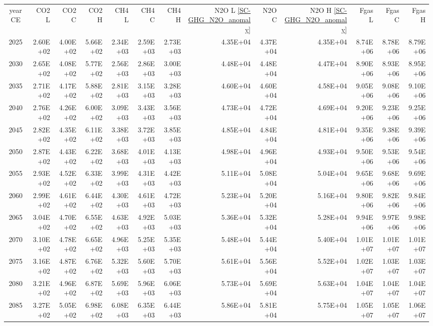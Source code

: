 \documentclass{article}
\begin{document}
\begin{table}
\begin{tabular}{crrr|rrr|rrr|rrr}
year CE  & CO2 L    & CO2 C    & CO2 H    & CH4 L    & CH4 C    & CH4 H    & N2O L \ref{SC-GHG_N2O_anomaly}     & N2O C      & N2O H \ref{SC-GHG_N2O_anomaly}    & Fgas L   & Fgas C   & Fgas H   \\
2025     & 2.60E+02 & 4.00E+02 & 5.66E+02 & 2.34E+03 & 2.59E+03 & 2.73E+03 & 4.35E+04 & 4.37E+04 & 4.35E+04 & 8.74E+06 & 8.78E+06 & 8.79E+06 \\
2030     & 2.65E+02 & 4.08E+02 & 5.77E+02 & 2.56E+03 & 2.86E+03 & 3.00E+03 & 4.48E+04 & 4.48E+04 & 4.47E+04 & 8.90E+06 & 8.93E+06 & 8.95E+06 \\
2035     & 2.71E+02 & 4.17E+02 & 5.88E+02 & 2.81E+03 & 3.15E+03 & 3.28E+03 & 4.60E+04 & 4.60E+04 & 4.58E+04 & 9.05E+06 & 9.08E+06 & 9.10E+06 \\
2040     & 2.76E+02 & 4.26E+02 & 6.00E+02 & 3.09E+03 & 3.43E+03 & 3.56E+03 & 4.73E+04 & 4.72E+04 & 4.69E+04 & 9.20E+06 & 9.23E+06 & 9.25E+06 \\
2045     & 2.82E+02 & 4.35E+02 & 6.11E+02 & 3.38E+03 & 3.72E+03 & 3.85E+03 & 4.85E+04 & 4.84E+04 & 4.81E+04 & 9.35E+06 & 9.38E+06 & 9.39E+06 \\
2050     & 2.87E+02 & 4.43E+02 & 6.22E+02 & 3.68E+03 & 4.01E+03 & 4.13E+03 & 4.98E+04 & 4.96E+04 & 4.93E+04 & 9.50E+06 & 9.53E+06 & 9.54E+06 \\
2055     & 2.93E+02 & 4.52E+02 & 6.33E+02 & 3.99E+03 & 4.31E+03 & 4.42E+03 & 5.11E+04 & 5.08E+04 & 5.04E+04 & 9.65E+06 & 9.68E+06 & 9.69E+06 \\
2060     & 2.99E+02 & 4.61E+02 & 6.44E+02 & 4.30E+03 & 4.61E+03 & 4.72E+03 & 5.23E+04 & 5.20E+04 & 5.16E+04 & 9.80E+06 & 9.82E+06 & 9.84E+06 \\
2065     & 3.04E+02 & 4.70E+02 & 6.55E+02 & 4.63E+03 & 4.92E+03 & 5.03E+03 & 5.36E+04 & 5.32E+04 & 5.28E+04 & 9.94E+06 & 9.97E+06 & 9.98E+06 \\
2070     & 3.10E+02 & 4.78E+02 & 6.65E+02 & 4.96E+03 & 5.25E+03 & 5.35E+03 & 5.48E+04 & 5.44E+04 & 5.40E+04 & 1.01E+07 & 1.01E+07 & 1.01E+07 \\
2075     & 3.16E+02 & 4.87E+02 & 6.76E+02 & 5.32E+03 & 5.60E+03 & 5.70E+03 & 5.61E+04 & 5.56E+04 & 5.52E+04 & 1.02E+07 & 1.03E+07 & 1.03E+07 \\
2080     & 3.21E+02 & 4.96E+02 & 6.87E+02 & 5.69E+03 & 5.96E+03 & 6.06E+03 & 5.73E+04 & 5.69E+04 & 5.63E+04 & 1.04E+07 & 1.04E+07 & 1.04E+07 \\
2085     & 3.27E+02 & 5.05E+02 & 6.98E+02 & 6.08E+03 & 6.35E+03 & 6.44E+03 & 5.86E+04 & 5.81E+04 & 5.75E+04 & 1.05E+07 & 1.05E+07 & 1.06E+07 \\

\end{tabular}
\end{table}
\end{document}
